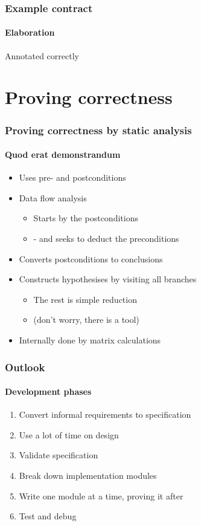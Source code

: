 \documentclass[presentation]{beamer}   %
\begin{document}
\begin{frame}
  \frametitle{Example contract}
  \framesubtitle{Elaboration}
  \begin{block}{Annotated correctly}
 
 \end{block}

\end{frame}

\section{Proving correctness}
\begin{frame}
  \frametitle{Proving correctness by static analysis}
  \framesubtitle{Quod erat demonstrandum}
   \begin{itemize}
        \item Uses pre- and postconditions
        \item Data flow analysis
        \begin{itemize}
         \item Starts by the postconditions
         \item  - and seeks to deduct the preconditions
         \end{itemize}
        \item Converts postconditions to conclusions
        \item Constructs hypothesises by visiting all branches
         \begin{itemize}
         \item The rest is simple reduction
         \item (don't worry, there is a tool)
         \end{itemize}
        \item Internally done by matrix calculations
      \end{itemize}  
\end{frame}

\begin{frame}
  \frametitle{Outlook}
  \framesubtitle{Development phases}
 \begin{enumerate}
   \item Convert informal requirements to specification
   \item Use a lot of time on design
   \item Validate specification
   \item Break down implementation modules
   \item Write one module at a time, proving it after
   \item Test and debug
  \end{enumerate}
\end{frame}
\end{document}
